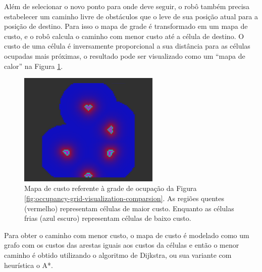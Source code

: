 Além de selecionar o novo ponto para onde deve seguir, o robô também 
precisa estabelecer um caminho livre de obstáculos que o leve de sua 
posição atual para a posição de destino. Para isso o mapa de grade é 
transformado em um mapa de custo, e o robô calcula o caminho com menor custo até a célula de destino. O custo de uma célula é inversamente 
proporcional a sua distância para as células ocupadas mais próximas, o 
resultado pode ser visualizado como um ``mapa de calor'' na Figura 
\ref{fig:costmap}.

\begin{figure}
  \centering
  \includegraphics[width=0.6\textwidth]{figs/costmap.png}
  \caption{Mapa de custo referente à grade de ocupação da Figura \ref{fig:occupancy-grid-visualization-comparsion}. As regiões quentes (vermelho) representam células de maior custo. Enquanto as células 
  frias (azul escuro) representam células de baixo custo.}
  \label{fig:costmap}
\end{figure}

Para obter o caminho com menor custo, o mapa de custo é modelado como 
um grafo com os custos das arestas iguais aos custos da células e então 
o menor caminho é obtido utilizando o algoritmo de Dijkstra, ou sua 
variante com heurística o A*.
